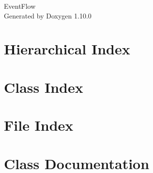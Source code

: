 \documentclass[twoside]{book}
\newcommand{\+}{\discretionary{\mbox{\scriptsize$\hookleftarrow$}}{}{}}
\newcommand{\clearemptydoublepage}{%
    \newpage{\pagestyle{empty}\cleardoublepage}%
  }
\begin{document}
  \raggedbottom
    \hypersetup{pageanchor=false,
                bookmarksnumbered=true,
                pdfencoding=unicode
               }
  \begin{titlepage}
  \vspace*{7cm}
  \begin{center}%
  {\Large Event\+Flow}\\
  \vspace*{1cm}
  {\large Generated by Doxygen 1.10.0}\\
  \end{center}
  \end{titlepage}
  \clearemptydoublepage
  \tableofcontents
  \clearemptydoublepage
  \hypersetup{pageanchor=true}

\chapter{Hierarchical Index}

\chapter{Class Index}

\chapter{File Index}

\chapter{Class Documentation}






























\end{document}
